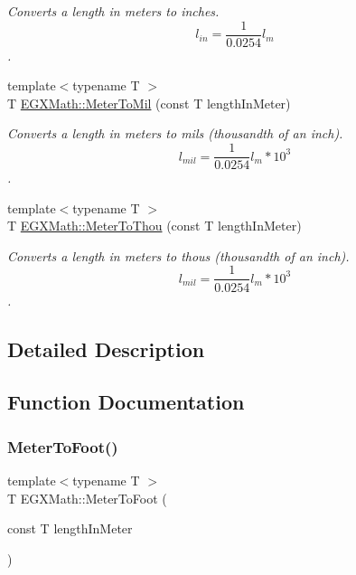 \begin{DoxyCompactItemize}
\begin{DoxyCompactList}\small\item\em Converts a length in meters to inches. \[ l_{in}=\frac{1}{0.0254} l_{m} \]. \end{DoxyCompactList}\item 
{\footnotesize template$<$typename T $>$ }\\T \mbox{\hyperlink{group___e_g_x_math-_conversions-_length_conversions-_s_i-_meter-_imperial_ga6a58893d0f7e17e425c7bd0b3235320d}{E\+G\+X\+Math\+::\+Meter\+To\+Mil}} (const T length\+In\+Meter)
\begin{DoxyCompactList}\small\item\em Converts a length in meters to mils (thousandth of an inch). \[ l_{mil}= \frac{1}{0.0254} l_{m} * 10^{3} \]. \end{DoxyCompactList}\item 
{\footnotesize template$<$typename T $>$ }\\T \mbox{\hyperlink{group___e_g_x_math-_conversions-_length_conversions-_s_i-_meter-_imperial_gaebe39a6b8485aae53724390225f27a66}{E\+G\+X\+Math\+::\+Meter\+To\+Thou}} (const T length\+In\+Meter)
\begin{DoxyCompactList}\small\item\em Converts a length in meters to thous (thousandth of an inch). \[ l_{mil}= \frac{1}{0.0254} l_{m} * 10^{3} \]. \end{DoxyCompactList}\end{DoxyCompactItemize}


\subsection{Detailed Description}


\subsection{Function Documentation}
\mbox{\label{group___e_g_x_math-_conversions-_length_conversions-_s_i-_meter-_imperial_gad5d3d7875ebe02e1a988665271360f34}} 
\subsubsection{\texorpdfstring{Meter\+To\+Foot()}{MeterToFoot()}}
{\footnotesize\ttfamily template$<$typename T $>$ \\
T E\+G\+X\+Math\+::\+Meter\+To\+Foot (\begin{DoxyParamCaption}\item[{const T}]{length\+In\+Meter }\end{DoxyParamCaption})}



